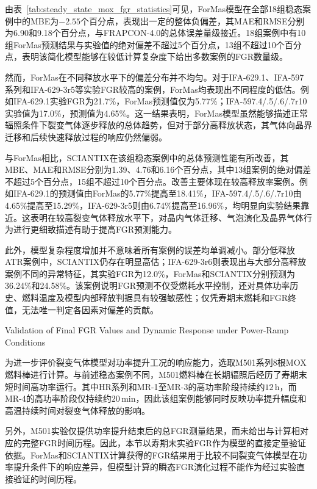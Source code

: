 由表~\ref{tab:steady_state_mox_fgr_statistics}可见，ForMas模型在全部18组稳态案例中的MBE为$-2.55$个百分点，表现出一定的整体负偏差，其MAE和RMSE分别为6.90和9.18个百分点，与FRAPCON-4.0的总体误差量级接近。18组案例中有10组ForMas预测结果与实验值的绝对偏差不超过5个百分点，13组不超过10个百分点，表明该简化模型能够在较低计算复杂度下给出多数案例的FGR数量级。

然而，ForMas在不同释放水平下的偏差分布并不均匀。对于IFA-629.1、IFA-597系列和IFA-629-3r5等实验FGR较高的案例，ForMas均表现出不同程度的低估。例如IFA-629.1实验FGR为21.7\%，ForMas预测值仅为5.77\%；IFA-597.4/.5/.6/.7r10实验值为17.0\%，预测值为4.65\%。这一结果表明，ForMas模型虽然能够描述正常辐照条件下裂变气体逐步释放的总体趋势，但对于部分高释放状态，其气体向晶界迁移和后续快速释放过程的响应仍然偏弱。

与ForMas相比，SCIANTIX在该组稳态案例中的总体预测性能有所改善，其MBE、MAE和RMSE分别为1.39、4.76和6.16个百分点，其中13组案例的绝对偏差不超过5个百分点，15组不超过10个百分点。改善主要体现在较高释放率案例。例如IFA-629.1的预测值由ForMas的5.77\%提高至18.41\%，IFA-597.4/.5/.6/.7r10由4.65\%提高至15.29\%，IFA-629-3r5则由6.74\%提高至16.96\%，均明显向实验结果靠近。这表明在较高裂变气体释放水平下，对晶内气体迁移、气泡演化及晶界气体行为进行更细致描述有助于提高FGR预测能力。

此外，模型复杂程度增加并不意味着所有案例的误差均单调减小。部分低释放ATR案例中，SCIANTIX仍存在明显高估；IFA-629-3r6则表现出与大部分高释放案例不同的异常特征，其实验FGR为12.0\%，ForMas和SCIANTIX分别预测为36.24\%和24.58\%。该案例说明FGR预测不仅受燃耗水平控制，还对具体功率历史、燃料温度及模型内部释放判据具有较强敏感性；仅凭寿期末燃耗和FGR终值，无法唯一判定各因素对偏差的贡献。

{Validation of Final FGR Values and Dynamic Response under Power-Ramp Conditions}

为进一步评价裂变气体模型对功率提升工况的响应能力，选取M501系列8根MOX燃料棒进行计算。与前述稳态案例不同，M501燃料棒在长期辐照后经历了寿期末短时间高功率运行。其中HR系列和MR-1至MR-3的高功率阶段持续约$12\,\mathrm{h}$，而MR-4的高功率阶段仅持续约$20\,\mathrm{min}$，因此该组案例能够同时反映功率提升幅度和高温持续时间对裂变气体释放的影响。

另外，M501实验仅提供功率提升结束后的总FGR测量结果，而未给出与计算相对应的完整FGR时间历程。因此，本节以寿期末实验FGR作为模型的直接定量验证依据。ForMas和SCIANTIX计算获得的FGR结果用于比较不同裂变气体模型在功率提升条件下的响应差异，但模型计算的瞬态FGR演化过程不能作为经过实验直接验证的时间历程。

